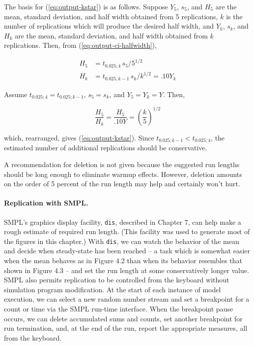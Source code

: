 The basis for (\ref{eq:output-kstar}) is as follows. Suppose $Y_5$, $s_5$, and
$H_5$ are the mean, standard deviation, and half width obtained from 5
replications, $k$ is the number of replications which will produce the desired
half width, and $Y_k$, $s_k$, and $H_k$ are the mean, standard deviation, and
half width obtained from $k$ replications. Then, from
(\ref{eq:output-ci-halfwidth}),

\begin{align}
H_5 &= t_{0.025;4}\, s_5/5^{1/2} \\
H_k &= t_{0.025;k-1}\, s_k/k^{1/2} = .10Y_k
\end{align}

Assume $t_{0.025;4} = t_{0.025;k-1}$, $s_5 = s_k$, and $Y_5 = Y_k = Y$. Then,

\begin{equation}
\frac{H_5}{H_k} = \frac{H_5}{.10Y} = \left(\frac{k}{5}\right)^{1/2}
\end{equation}

which, rearranged, gives (\ref{eq:output-kstar}). Since
$t_{0.025;k-1} < t_{0.025;4}$, the estimated number of additional replications
should be conservative.

A recommendation for deletion is not given because the suggested run lengths
should be long enough to eliminate warmup effects. However, deletion amounts
on the order of 5 percent of the run length may help and certainly won't hurt.

\paragraph{Replication with SMPL.}
SMPL's graphics display facility, \texttt{dis}, described in Chapter 7, can help
make a rough estimate of required run length. (This facility was used to
generate most of the figures in this chapter.) With \texttt{dis}, we can watch the
behavior of the mean and decide when steady-state has been reached -- a task
which is somewhat easier when the mean behaves as in Figure 4.2 than when
its behavior resembles that shown in Figure 4.3 -- and set the run length at
some conservatively longer value. SMPL also permits replication to be
controlled from the keyboard without simulation program modification. At the
start of each instance of model execution, we can select a new random number
stream and set a breakpoint for a count or time via the SMPL run-time
interface. When the breakpoint pause occurs, we can delete accumulated sums
and counts, set another breakpoint for run termination, and, at the end of the
run, report the appropriate measures, all from the keyboard.

